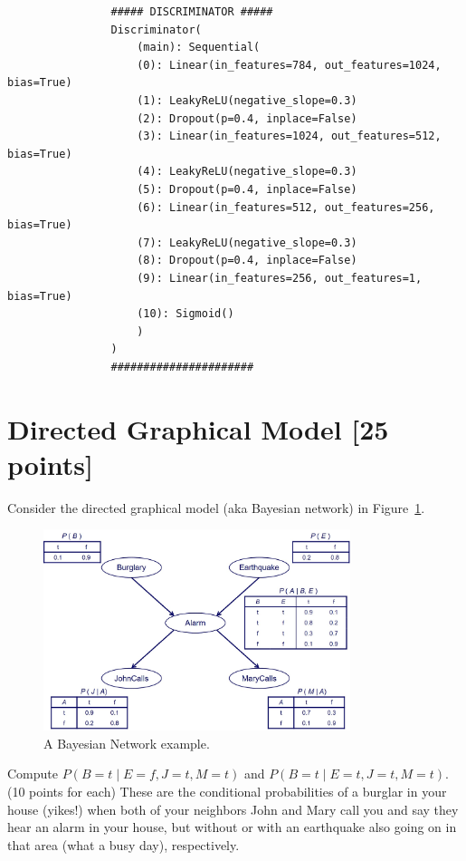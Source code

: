\documentclass[a4paper]{article}
\theoremstyle{definition}
\newenvironment{soln}{
	\leavevmode\color{blue}\ignorespaces
}{}
\begin{document}
\begin{enumerate} [label=(\alph*)]
\begin{soln}
\begin{verbatim}
				##### DISCRIMINATOR #####
				Discriminator(
					(main): Sequential(
					(0): Linear(in_features=784, out_features=1024, bias=True)
					(1): LeakyReLU(negative_slope=0.3)
					(2): Dropout(p=0.4, inplace=False)
					(3): Linear(in_features=1024, out_features=512, bias=True)
					(4): LeakyReLU(negative_slope=0.3)
					(5): Dropout(p=0.4, inplace=False)
					(6): Linear(in_features=512, out_features=256, bias=True)
					(7): LeakyReLU(negative_slope=0.3)
					(8): Dropout(p=0.4, inplace=False)
					(9): Linear(in_features=256, out_features=1, bias=True)
					(10): Sigmoid()
					)
				)
				######################
			\end{verbatim}
			
		\end{soln}
		
	\end{enumerate}

\section{Directed Graphical Model [25 points]}
Consider the directed graphical model (aka Bayesian network) in Figure~\ref{fig:bn}.
\begin{figure}[H]
    \centering
    \includegraphics[width=0.8\textwidth]{BN.jpeg}
    \caption{A Bayesian Network example.}
    \label{fig:bn}
\end{figure}
Compute $P(B=t \mid E=f,J=t,M=t)$ and $P(B=t \mid E=t,J=t,M=t)$. (10 points for each) These are the conditional probabilities of a burglar in your house (yikes!) when both of your neighbors John and Mary call you and say they hear an alarm in your house, but without or with an earthquake also going on in that area (what a busy day), respectively.
\end{document}
